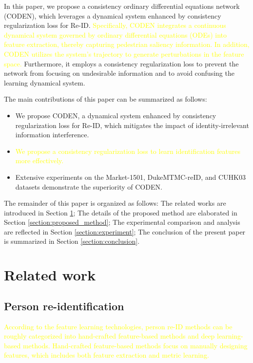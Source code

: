 \documentclass[12pt]{spieman}  %
\begin{document}
\begin{spacing}{2}
		In this paper, we propose a consistency ordinary differential equations network (CODEN), which leverages a dynamical system enhanced by consistency regularization loss for Re-ID.
		\textcolor{yellow}{Specifically, CODEN integrates a continuous dynamical system governed by ordinary differential equations (ODEs) into feature extraction, thereby capturing pedestrian saliency information. In addition, CODEN utilizes the system's trajectory to generate perturbations in the feature space.}
		Furthermore, it employs a consistency regularization loss to prevent the network from focusing on undesirable information and to avoid confusing the learning dynamical system.

		The main contributions of this paper can be summarized as follows:
		
		\begin{itemize}
			\item We propose CODEN, a dynamical system enhanced by consistency regularization loss for Re-ID, which mitigates the impact of identity-irrelevant information interference.
			\item \textcolor{yellow}{We propose a consistency regularization loss to learn identification features more effectively.}
			\item Extensive experiments on the Market-1501, DukeMTMC-reID, and CUHK03 datasets demonstrate the superiority of CODEN.
		\end{itemize}
		
		The remainder of this paper is organized as follows: The related works are introduced in Section \ref{section:related_work}; The details of the proposed method are elaborated in Section \ref{section:proposed_method}; The experimental comparison and analysis are reflected in Section \ref{section:experiment}; The conclusion of the present paper is summarized in Section \ref{section:conclusion}.
		
		\section{Related work} \label{section:related_work}
		\subsection{Person re-identification}
		\textcolor{yellow}{According to the feature learning technologies, person re-ID methods can be roughly categorized into hand-crafted feature-based methods and deep learning-based methods. Hand-crafted feature-based methods focus on manually designing features, which includes both feature extraction\cite{lowe2004distinctive, ojala2002multiresolution,dalal2005histograms} and metric learning\cite{pedagadi2013local,liao2015person,tao2016person}. }
		

\end{spacing}
\end{document}
